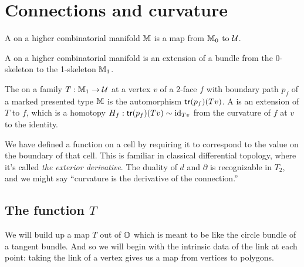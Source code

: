 \section{Connections and curvature}

\begin{mydef}
\label{def:bundle}
A  on a higher combinatorial manifold \( \mathbb{M} \) is a map from \( \mathbb{M}_0 \) to \( \mathcal{U} \).
\end{mydef}

\begin{mydef}
\label{def:connection}
A  on a higher combinatorial manifold is an extension of a bundle from the 0-skeleton to the 1-skeleton \( \mathbb{M}_1 \). 
\end{mydef}

\begin{mydef}
\label{def:curvature}
The  on a family \( T:\mathbb{M}_1\to\mathcal{U} \) at a vertex \( v \) of a 2-face \( f \) with boundary path \( p_f \) of a marked presented type \( \mathbb{M} \) is the automorphism \( \mathsf{tr}(p_f)(Tv) \). A  is an extension of \( T \) to \( f \), which is a homotopy \( H_f:\mathsf{tr}(p_f)(Tv)\sim\text{id}_{Tv} \) from the curvature of \( f \) at \( v \) to the identity.
\end{mydef}

\begin{mynote}
We have defined a function on a cell by requiring it to correspond to the value on the boundary of that cell. This is familiar in classical differential topology, where it's called \emph{the exterior derivative}. The duality of \( d \) and \( \partial \) is recognizable in \( T_2 \), and we might say ``curvature is the derivative of the connection.''
\end{mynote}

\subsection{The function \texorpdfstring{\( T \)}{T}}

We will build up a map \( T \) out of \( \mathbb{O} \) which is meant to be like the circle bundle of a tangent bundle. And so we will begin with the intrinsic data of the link at each point: taking the link of a vertex gives us a map from vertices to polygons.

